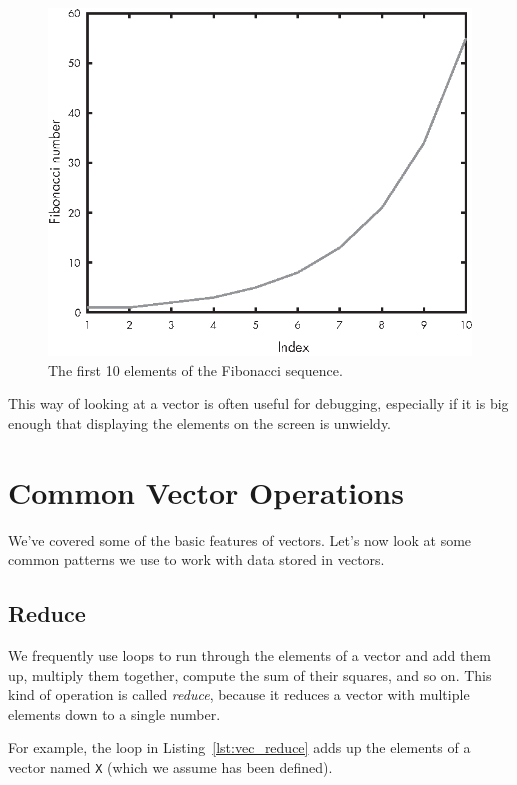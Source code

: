 \begin{figure}[h]
\centerline{\includegraphics{book/images/figure04_01_new_v1.eps}}
\caption{The first 10 elements of the Fibonacci sequence.}
\label{fig:fibonacci}
\end{figure}

This way of looking at a vector is often useful for debugging, especially
if it is big enough that displaying the elements on
the screen is unwieldy.


\section{Common Vector Operations}

We've covered some of the basic features of vectors. Let's now look at some common patterns we use to work with data stored in vectors.

\subsection{Reduce}
\label{reduce}

We frequently use loops to run through the elements of a vector
and add them up, multiply them together, compute the sum
of their squares, and so on.  This kind of operation is called \emph{reduce},
because it reduces a vector with multiple elements down to a single
number.


For example, the loop in Listing~\ref{lst:vec_reduce} adds up the elements of a vector named \lstinline{X} (which we assume has been defined).

